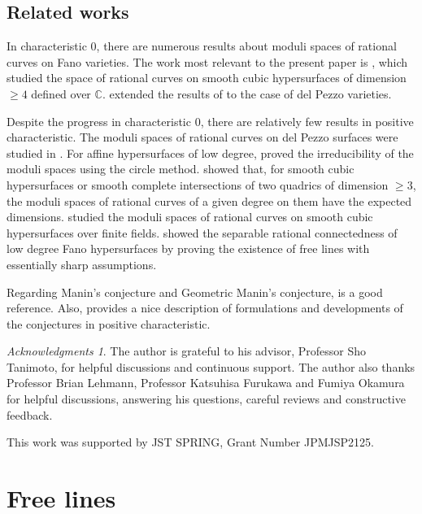 \documentclass[dvipdfmx, 12pt, a4paper]{amsart}
\theoremstyle{plain}
\theoremstyle{definition}
\theoremstyle{remark}
\newtheorem*{ack}{Acknowledgments}
\newcommand{\bC}{\mathbb{C}}
\begin{document}
\subsection{Related works}

	In characteristic $0$, there are numerous results about moduli spaces of rational curves on Fano varieties. The work most relevant to the present paper is \cite{CoskunStarr2009}, which studied the space of rational curves on smooth cubic hypersurfaces of dimension $\geq4$ defined over $\bC$.
	\cite{Okamura2024} extended the results of \cite{CoskunStarr2009} to the case of del Pezzo varieties.
	
	Despite the progress in characteristic $0$, there are relatively few results in positive characteristic. The moduli spaces of rational curves on del Pezzo surfaces were studied in \cite{BLRT2023Rat}. For affine hypersurfaces of low degree, \cite{BrowningSawin2020geometric} proved the irreducibility of the moduli spaces using the circle method. \cite{glas2025} showed that, for smooth cubic hypersurfaces or smooth complete intersections of two quadrics of dimension $\geq3$, the moduli spaces of rational curves of a given degree on them have the expected dimensions. \cite{Manzuacteanu2021cubic} studied the moduli spaces of rational curves on smooth cubic hypersurfaces over finite fields. \cite{Beheshti2025separable} showed the separable rational connectedness of low degree Fano hypersurfaces by proving the existence of free lines with essentially sharp assumptions.
	
	Regarding Manin's conjecture and Geometric Manin's conjecture, \cite{Tanimoto2025Book} is a good reference. Also, \cite{LT2026GMCinp} provides a nice description of formulations and developments of the conjectures in positive characteristic.


\begin{ack}
	The author is grateful to his advisor, Professor Sho Tanimoto, for helpful discussions and continuous support. The author also thanks Professor Brian Lehmann, Professor Katsuhisa Furukawa and Fumiya Okamura for helpful discussions, answering his questions, careful reviews and constructive feedback. 
	
	This work was supported by JST SPRING, Grant Number JPMJSP2125.
\end{ack}



\section{Free lines}
\end{document}
